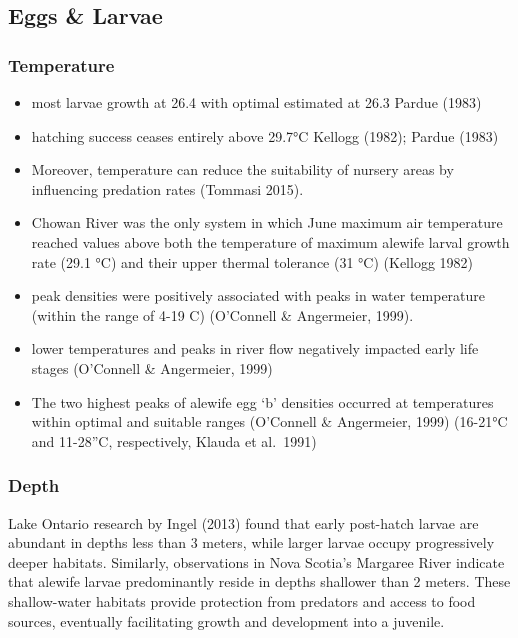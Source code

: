 \documentclass[
]{book}
\begin{document}
\hypertarget{eggs-larvae}{%
\subsection{Eggs \& Larvae}\label{eggs-larvae}}

\hypertarget{temperature-2}{%
\subsubsection{Temperature}\label{temperature-2}}

\begin{itemize}
\item
  most larvae growth at 26.4 with optimal estimated at 26.3 Pardue (1983)
\item
  hatching success ceases entirely above 29.7°C Kellogg (1982); Pardue (1983)
\item
  Moreover, temperature can reduce the suitability of nursery areas by influencing predation rates (Tommasi 2015).
\item
  Chowan River was the only system in which June maximum air temperature reached values above both the temperature of maximum alewife larval growth rate (29.1 °C) and their upper thermal tolerance (31 °C) (Kellogg 1982)
\item
  peak densities were positively associated with peaks in water temperature (within the range of 4-19 C) (O'Connell \& Angermeier, 1999).
\item
  lower temperatures and peaks in river flow negatively impacted early life stages (O'Connell \& Angermeier, 1999)
\item
  The two highest peaks of alewife egg `b' densities occurred at temperatures within optimal and suitable ranges (O'Connell \& Angermeier, 1999) (16-21°C and 11-28''C, respectively, Klauda et al.~1991)
\end{itemize}

\hypertarget{depth-2}{%
\subsubsection{Depth}\label{depth-2}}

Lake Ontario research by Ingel (2013) found that early post-hatch larvae are abundant in depths less than 3 meters, while larger larvae occupy progressively deeper habitats.
Similarly, observations in Nova Scotia's Margaree River indicate that alewife larvae predominantly reside in depths shallower than 2 meters.
These shallow-water habitats provide protection from predators and access to food sources, eventually facilitating growth and development into a juvenile.
\end{document}
